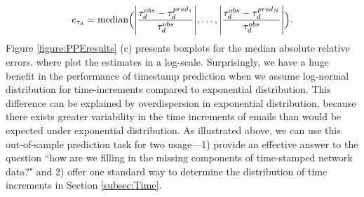 \documentclass[ba]{imsart}
\numberwithin{equation}{section}
\theoremstyle{plain}
\DeclarePairedDelimiter\abs{\lvert}{\rvert}
\begin{document}
		\fi
		\begin{equation}
		e_{\tau_d} = \mbox{median}\Big(\abs*{\frac{\tau^{obs}_d - \tau^{pred_1}_{d}}{\tau^{obs}_d}},\ldots, \abs*{\frac{\tau^{obs}_d - \tau^{pred_N}_{d}}{\tau^{obs}_d}}\Big).
		\end{equation}
	Figure \ref{figure:PPEresults} (c) presents boxplots for the median absolute relative errors. where plot the estimates in a log-scale. Surprisingly, we have a huge benefit in the performance of timestamp prediction when we assume log-normal distribution for time-increments compared to exponential distribution. This difference can be explained by overdispersion in exponential distribution, because there exists greater variability in the time increments of emails than would be expected under exponential distribution. As illustrated above, we can use this out-of-sample prediction task for two usage---1) provide an effective answer to the question ``how are we filling in the missing components of time-stamped network data?" and 2) offer one standard way to determine the distribution of time increments in Section \ref{subsec:Time}. 
\end{document}
